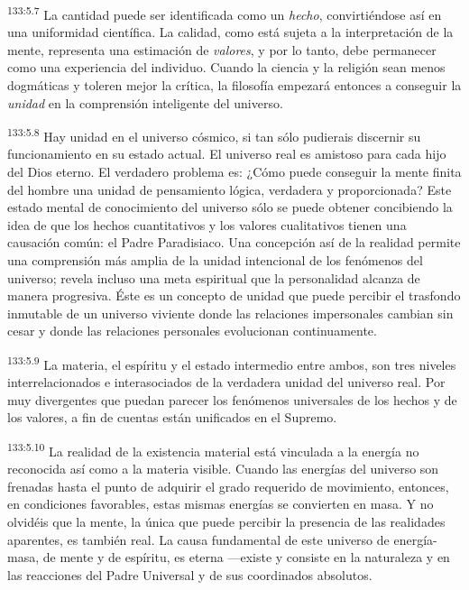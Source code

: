 \par 
\textsuperscript{133:5.7} La cantidad puede ser identificada como un \textit{hecho}, convirtiéndose así en una uniformidad científica. La calidad, como está sujeta a la interpretación de la mente, representa una estimación de \textit{valores}, y por lo tanto, debe permanecer como una experiencia del individuo. Cuando la ciencia y la religión sean menos dogmáticas y toleren mejor la crítica, la filosofía empezará entonces a conseguir la \textit{unidad} en la comprensión inteligente del universo.

\par 
\textsuperscript{133:5.8} Hay unidad en el universo cósmico, si tan sólo pudierais discernir su funcionamiento en su estado actual. El universo real es amistoso para cada hijo del Dios eterno. El verdadero problema es: ¿Cómo puede conseguir la mente finita del hombre una unidad de pensamiento lógica, verdadera y proporcionada? Este estado mental de conocimiento del universo sólo se puede obtener concibiendo la idea de que los hechos cuantitativos y los valores cualitativos tienen una causación común: el Padre Paradisiaco. Una concepción así de la realidad permite una comprensión más amplia de la unidad intencional de los fenómenos del universo; revela incluso una meta espiritual que la personalidad alcanza de manera progresiva. Éste es un concepto de unidad que puede percibir el trasfondo inmutable de un universo viviente donde las relaciones impersonales cambian sin cesar y donde las relaciones personales evolucionan continuamente.

\par 
\textsuperscript{133:5.9} La materia, el espíritu y el estado intermedio entre ambos, son tres niveles interrelacionados e interasociados de la verdadera unidad del universo real. Por muy divergentes que puedan parecer los fenómenos universales de los hechos y de los valores, a fin de cuentas están unificados en el Supremo.

\par 
\textsuperscript{133:5.10} La realidad de la existencia material está vinculada a la energía no reconocida así como a la materia visible. Cuando las energías del universo son frenadas hasta el punto de adquirir el grado requerido de movimiento, entonces, en condiciones favorables, estas mismas energías se convierten en masa. Y no olvidéis que la mente, la única que puede percibir la presencia de las realidades aparentes, es también real. La causa fundamental de este universo de energía-masa, de mente y de espíritu, es eterna ---existe y consiste en la naturaleza y en las reacciones del Padre Universal y de sus coordinados absolutos.

